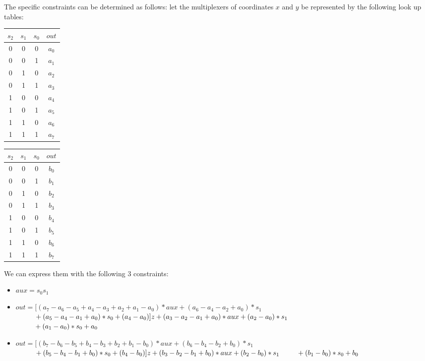 The specific constraints can be determined as follows: let the multiplexers of coordinates $x$ and $y$ be represented by the following look up tables:
\begin{table}[h]
    \begin{minipage}{.5\linewidth}
      \centering
	\begin{tabular}{c|c|c|c}
                $s_2$ & $s_1$ & $s_0$ & $out$\\
                	\hline
                	0 & 0 & 0 & $a_0$\\
                	0 & 0 & 1 & $a_1$\\
                	0 & 1 & 0 & $a_2$\\
                	0 & 1 & 1 & $a_3$\\
                	1 & 0 & 0 & $a_4$\\
                	1 & 0 & 1 & $a_5$\\
                	1 & 1 & 0 & $a_6$\\
                	1 & 1 & 1 & $a_7$
      	\end{tabular}
    \end{minipage}%
    \begin{minipage}{.5\linewidth}
      \centering
	\begin{tabular}{c|c|c|c}
		$s_2$ & $s_1$ & $s_0$ & $out$\\
		\hline
		0 & 0 & 0 & $b_0$\\
		0 & 0 & 1 & $b_1$\\
		0 & 1 & 0 & $b_2$\\
		0 & 1 & 1 & $b_3$\\
		1 & 0 & 0 & $b_4$\\
		1 & 0 & 1 & $b_5$\\
		1 & 1 & 0 & $b_6$\\
		1 & 1 & 1 & $b_7$
	\end{tabular}
    \end{minipage} 
\end{table}

\noi We can express them with the following 3 constraints:
\begin{itemize}
    \item 	$aux = s_0 s_1$ %
    \item 	$out = [ (a_7-a_6-a_5+a_4-a_3+a_2+a_1-a_0)*aux 
    		+ (a_6-a_4-a_2+a_0)*s_1$ \\
    		$\text{\qquad\;\;} + (a_5-a_4-a_1+a_0)*s_0
    		+ (a_4 - a_0) ] z 
    		+ (a_3-a_2-a_1+a_0)*aux + (a_2-a_0)*s_1 $\\
    		$\text{\qquad\;\;} + (a_1-a_0)*s_0+ a_0$
    \item	$ out = [ (b_7-b_6-b_5+b_4-b_3+b_2+b_1-b_0)*aux 
    		+ (b_6-b_4-b_2+b_0)*s_1$ \\
    		$\text{\qquad\;\;} + (b_5-b_4-b_1+b_0)*s_0 
    		+ (b_4 - b_0)] z 
    		+ (b_3-b_2-b_1+b_0)*aux + (b_2-b_0)*s_1 \\
    		\text{\qquad\;\:} + (b_1-b_0)*s_0+ b_0$\\
\end{itemize}
